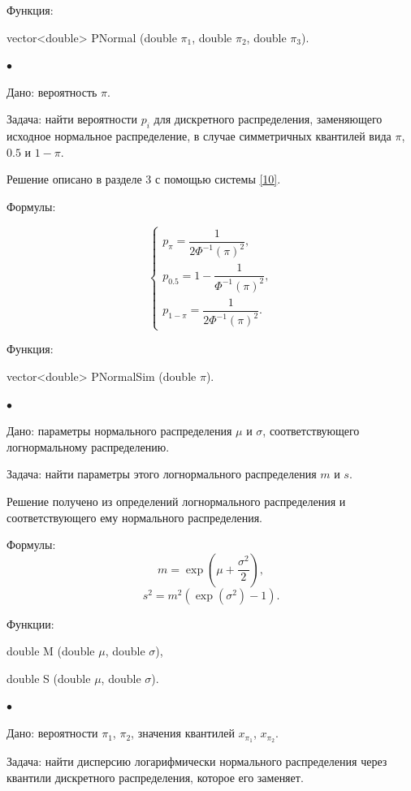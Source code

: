\documentclass[12pt]{article}
\begin{document}
	Функция:
	
	vector<double> PNormal (double $\pi_{1}$, double $\pi_{2}$, double $\pi_{3}$).
	
	$\bullet$
	
	Дано:
	вероятность $\pi$.
	
	Задача:
	найти вероятности $p_{i}$ для дискретного распределения, заменяющего исходное нормальное распределение, в случае симметричных квантилей вида  $\pi$, $0.5$ и $1-\pi$.
	
	Решение описано в разделе 3 с помощью системы \eqref{10}.
	
	Формулы:
	
	\begin{equation*}
		\begin{cases}
			p_{\pi} = \displaystyle{\dfrac{1}{2\Phi ^{-1}(\pi)^{2}}},\\ 
			p_{0.5}=\displaystyle{1-\dfrac{1}{\Phi ^{-1}(\pi)^{2}}} , \\ 
			p_{1-\pi}=\displaystyle{\dfrac{1}{2\Phi ^{-1}(\pi)^{2}}}.
		\end{cases}
	\end{equation*}
	
	Функция:
	
	vector<double> PNormalSim (double $\pi$).
	
	$\bullet$
	
	Дано:
	параметры нормального распределения $\mu$ и $\sigma$, соответствующего логнормальному распределению.
	
	Задача:
	найти параметры этого логнормального распределения $m$ и $s$. 
	
	Решение получено из определений логнормального распределения и соответствующего ему нормального распределения.
	
	Формулы:
	\begin{equation*}
		m = \exp(\mu+\frac{\sigma ^{2}}{2}),
	\end{equation*}
	\begin{equation*}
		s^{2} = m^{2}(\exp(\sigma^{2})-1).
	\end{equation*}
	
	Функции:
	
	double M (double $\mu$, double $\sigma$),
	
	double S (double $\mu$, double $\sigma$).
	
	$\bullet$
	
	Дано:
	вероятности $\pi_{1}$, $\pi_{2}$, значения квантилей $x_{\pi_{1}}$, $x_{\pi_{2}}$.
	
	Задача:
	найти дисперсию логарифмически нормального распределения через квантили дискретного распределения, которое его заменяет.
	
\end{document}
